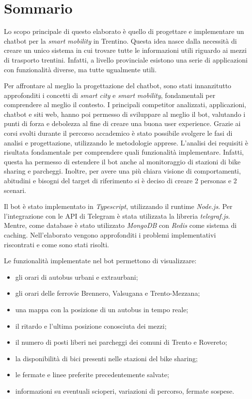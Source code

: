 \chapter*{Sommario} %
\label{sommario}


Lo scopo principale di questo elaborato è quello di progettare e implementare un chatbot per la \textit{smart mobility} in Trentino. Questa idea nasce dalla necessità di creare un unico sistema in cui trovare tutte le informazioni utili riguardo ai mezzi di trasporto trentini. Infatti, a livello provinciale esistono una serie di applicazioni con funzionalità diverse, ma tutte ugualmente utili. 

Per affrontare al meglio la progettazione del chatbot, sono stati innanzitutto approfonditi i concetti di \textit{smart city} e \textit{smart mobility}, fondamentali per comprendere al meglio il contesto. I principali competitor analizzati, applicazioni, chatbot e siti web, hanno poi permesso di sviluppare al meglio il bot, valutando i punti di forza e debolezza al fine di creare una buona user experience. 
Grazie ai corsi svolti durante il percorso accademico è stato possibile svolgere le fasi di analisi e progettazione, utilizzando le metodologie apprese. L'analisi dei requisiti è risultata fondamentale per comprendere quali funzionalità implementare. Infatti, questa ha permesso di estendere il bot anche al monitoraggio di stazioni di bike sharing e parcheggi.  Inoltre, per avere una più chiara visione di comportamenti, abitudini e bisogni del  target di riferimento si è deciso di creare 2 personas e 2 scenari. 

Il bot è stato implementato in \textit{Typescript}, utilizzando il runtime \textit{Node.js}. Per l'integrazione con le API di Telegram è stata utilizzata la libreria \textit{telegraf.js}. Mentre, come database è stato utilizzato \textit{MongoDB} con \textit{Redis} come sistema di caching. Nell'elaborato vengono approfonditi i problemi implementativi riscontrati e come sono stati risolti.

\noindent Le funzionalità implementate nel bot permettono di visualizzare: 
\begin{itemize}
\item gli orari di autobus urbani e extraurbani;
\item gli orari delle ferrovie Brennero, Valsugana e Trento-Mezzana;
\item una mappa con la posizione di un autobus in tempo reale;
\item il ritardo e l'ultima posizione conosciuta dei mezzi;
\item il numero di posti liberi nei parcheggi dei comuni di Trento e Rovereto;
\item la disponibilità di bici presenti nelle stazioni del bike sharing;
\item le fermate e linee preferite precedentemente salvate;
\item informazioni su eventuali scioperi, variazioni di percorso, fermate sospese.
\end{itemize}

